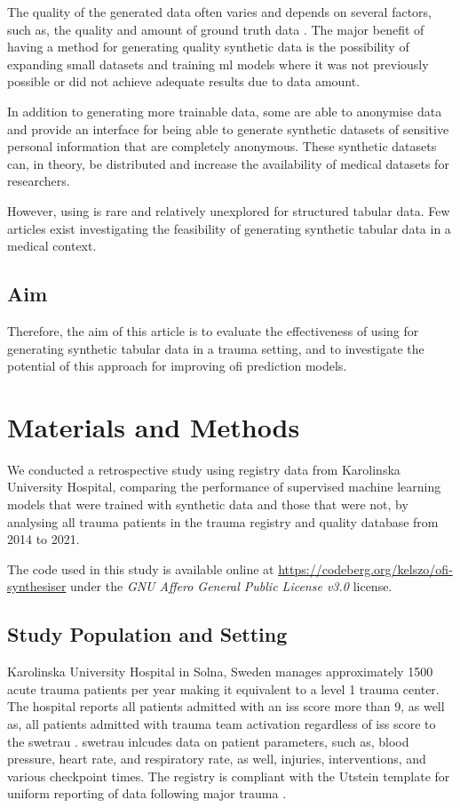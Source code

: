 \documentclass[12pt, letterpaper]{article}
\begin{document}
The quality of the generated data often varies and depends on several factors, such as, the quality and amount of ground truth data \cite{karras_training_2020}. The major benefit of having a method for generating quality synthetic data is the possibility of expanding small datasets and training \acrshort{ml} models where it was not previously possible or did not achieve adequate results due to data amount.

In addition to generating more trainable data, some  are able to anonymise data \cite{liu_ppgan_2019} and provide an interface for being able to generate synthetic datasets of sensitive personal information that are completely anonymous. These synthetic datasets can, in theory, be distributed and increase the availability of medical datasets for researchers.

However, using  is rare and relatively unexplored for structured tabular data. Few articles exist investigating the feasibility of generating synthetic tabular data in a medical context.

\subsection{Aim}
Therefore, the aim of this article is to evaluate the effectiveness of using  for generating synthetic tabular data in a trauma setting, and to investigate the potential of this approach for improving \acrshort{ofi} prediction models.

\section{Materials and Methods}
We conducted a retrospective study using registry data from Karolinska University Hospital, comparing the performance of supervised machine learning models that were trained with synthetic data and those that were not, by analysing all trauma patients in the trauma registry and quality database from 2014 to 2021.

The code used in this study is available online at \url{https://codeberg.org/kelszo/ofi-synthesiser} under the \textit{GNU Affero General Public License v3.0} license.

\subsection{Study Population and Setting}
Karolinska University Hospital in Solna, Sweden manages approximately 1500 acute trauma patients per year making it equivalent to a level 1 trauma center. The hospital reports all patients admitted with an \acrfull{iss} score more than 9, as well as, all patients admitted with trauma team activation regardless of \acrshort{iss} score to the \acrfull{swetrau} \cite{swetrau}. \acrshort{swetrau} inlcudes data on patient parameters, such as, blood pressure, heart rate, and respiratory rate, as well, injuries, interventions, and various checkpoint times. The registry is compliant with the Utstein template for uniform reporting of data following major trauma \cite{ringdal_utstein_2008}.
\end{document}
